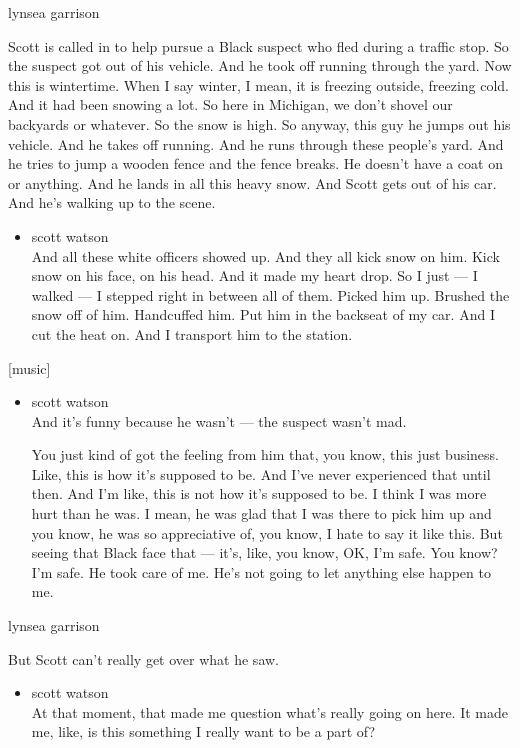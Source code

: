 lynsea garrison

Scott is called in to help pursue a Black suspect who fled during a
traffic stop. So the suspect got out of his vehicle. And he took off
running through the yard. Now this is wintertime. When I say winter, I
mean, it is freezing outside, freezing cold. And it had been snowing a
lot. So here in Michigan, we don't shovel our backyards or whatever. So
the snow is high. So anyway, this guy he jumps out his vehicle. And he
takes off running. And he runs through these people's yard. And he tries
to jump a wooden fence and the fence breaks. He doesn't have a coat on
or anything. And he lands in all this heavy snow. And Scott gets out of
his car. And he's walking up to the scene.

\begin{itemize}
\tightlist
\item
  scott watson\\
  And all these white officers showed up. And they all kick snow on him.
  Kick snow on his face, on his head. And it made my heart drop. So I
  just --- I walked --- I stepped right in between all of them. Picked
  him up. Brushed the snow off of him. Handcuffed him. Put him in the
  backseat of my car. And I cut the heat on. And I transport him to the
  station.
\end{itemize}

{[}music{]}

\begin{itemize}
\item
  scott watson\\
  And it's funny because he wasn't --- the suspect wasn't mad.

  You just kind of got the feeling from him that, you know, this just
  business. Like, this is how it's supposed to be. And I've never
  experienced that until then. And I'm like, this is not how it's
  supposed to be. I think I was more hurt than he was. I mean, he was
  glad that I was there to pick him up and you know, he was so
  appreciative of, you know, I hate to say it like this. But seeing that
  Black face that --- it's, like, you know, OK, I'm safe. You know? I'm
  safe. He took care of me. He's not going to let anything else happen
  to me.
\end{itemize}

lynsea garrison

But Scott can't really get over what he saw.

\begin{itemize}
\tightlist
\item
  scott watson\\
  At that moment, that made me question what's really going on here. It
  made me, like, is this something I really want to be a part of?
\end{itemize}

